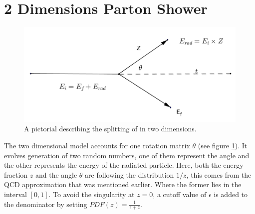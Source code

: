 %
%
%
%
%
%
%
%
%
%
%
\section{2 Dimensions Parton Shower}
\begin{figure}[hbtp]
\centering
\includegraphics[scale=.35]{images/tt.png}
\caption{A pictorial describing the splitting of in two dimensions.}\label{fig:tt}
\end{figure}

The two dimensional model accounts for one rotation matrix $\theta$ (see figure \ref{fig:tt}). It evolves generation of two random numbers, one of them represent the angle and the other represents the energy of the radiated particle. Here, both the energy fraction $z$ and the angle $\theta$ are following the distribution $1/z$, this comes from the QCD approximation that was mentioned earlier.  Where the former lies in the interval $[0, 1]$. To avoid the singularity at $z = 0$, a cutoff value of $\epsilon$ is added to the denominator by setting  $PDF(z) = \frac{1}{\epsilon + z}$.  

